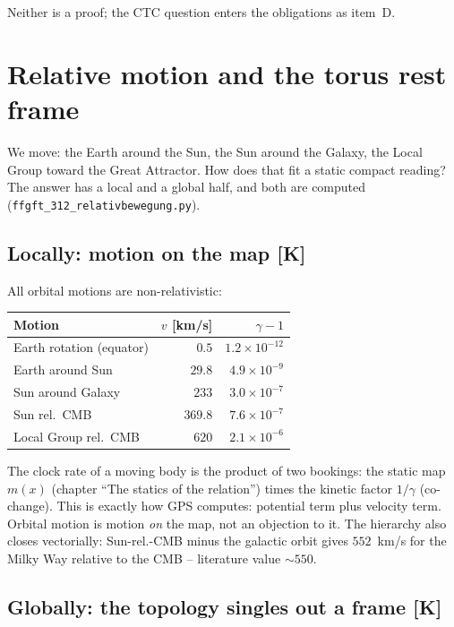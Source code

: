 Neither is a proof; the CTC question enters the obligations as
item~D.

\chapter{Relative motion and the torus rest frame}

We move: the Earth around the Sun, the Sun around the Galaxy, the
Local Group toward the Great Attractor. How does that fit a static
compact reading? The answer has a local and a global half, and both
are computed (\texttt{ffgft\_312\_relativbewegung.py}).

\section{Locally: motion on the map [K]}

All orbital motions are non-relativistic:

\begin{center}
\begin{tabular}{lrr}
\toprule
Motion & $v$ [km/s] & $\gamma-1$ \\
\midrule
Earth rotation (equator) & $0.5$ & $1.2\times10^{-12}$ \\
Earth around Sun & $29.8$ & $4.9\times10^{-9}$ \\
Sun around Galaxy & $233$ & $3.0\times10^{-7}$ \\
Sun rel.\ CMB & $369.8$ & $7.6\times10^{-7}$ \\
Local Group rel.\ CMB & $620$ & $2.1\times10^{-6}$ \\
\bottomrule
\end{tabular}
\end{center}

The clock rate of a moving body is the product of two bookings: the
static map $m(x)$ (chapter \enquote{The statics of the relation})
times the kinetic factor $1/\gamma$ (co-change). This is exactly how
GPS computes: potential term plus velocity term. Orbital motion is
motion \emph{on} the map, not an objection to it. The hierarchy
also closes vectorially: Sun-rel.-CMB minus the galactic orbit
gives $552$~km/s for the Milky Way relative to the CMB --
literature value $\sim550$.

\section{Globally: the topology singles out a frame [K]}

